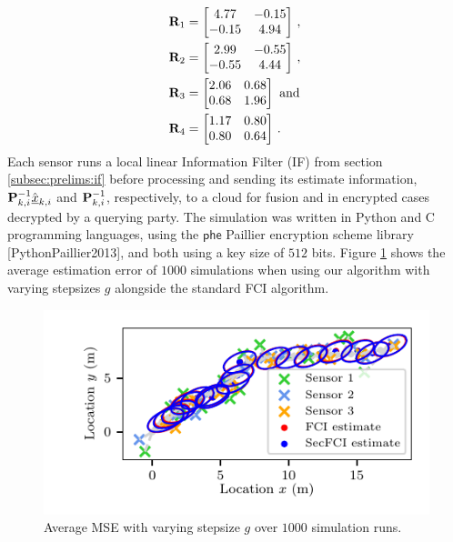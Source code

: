 \begin{equation}\label{eq:cloud_fusion:secfci_measurement_model_covariances}
    \begin{split}
        &{{\mathbf{R}}}_1 = 
        \begin{bmatrix}
            4.77 & -0.15\\
            -0.15 & 4.94
        \end{bmatrix}\,,\\
        &{{\mathbf{R}}}_2 = 
        \begin{bmatrix}
            2.99 & -0.55\\
            -0.55 & 4.44
        \end{bmatrix}\,,\\
        &{{\mathbf{R}}}_3 = 
        \begin{bmatrix}
            2.06 & 0.68\\
            0.68 & 1.96
        \end{bmatrix}\text{ and }\\
        &{{\mathbf{R}}}_4 = 
        \begin{bmatrix}
            1.17 & 0.80\\
            0.80 & 0.64
        \end{bmatrix}\,.
    \end{split}
\end{equation}
Each sensor runs a local linear Information Filter (IF) from section \ref{subsec:prelims:if} before processing and sending its estimate information, ${{\mathbf{P}}}_{k, i}^{-1}\hat{{\underline{x}}}_{k, i}$ and ${{\mathbf{P}}}_{k, i}^{-1}$, respectively, to a cloud for fusion and in encrypted cases decrypted by a querying party. The simulation was written in Python and C programming languages, using the $\mathsf{phe}$ Paillier encryption scheme library [PythonPaillier2013], and both using a key size of $512$ bits. Figure \ref{fig:cloud_fusion:secfci_sim_error} shows the average estimation error of $1000$ simulations when using our algorithm with varying stepsizes $g$ alongside the standard FCI algorithm. 
\begin{figure}[htbp]
    \centering
    \includegraphics{figures/fci_secfci_cmp.pdf}
    \caption{Average MSE with varying stepsize $g$ over $1000$ simulation runs.}
    \label{fig:cloud_fusion:secfci_sim_error}
 \end{figure}
